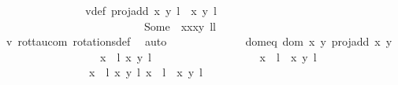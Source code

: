 \begin{isabellebody}
\ \ \ \ \ \ \ \ \ \ \ \ \isamarkupfalse%
\ \isamarkupfalse%
\ v{}{\isacharunderscore}def{\isacharcolon}\ {\isachardoublequoteopen}proj{\isacharunderscore}add\ {\isacharparenleft}{\isacharparenleft}x{\isacharcomma}\ y{\isacharparenright}{\isacharcomma}\ l{\isacharparenright}\ {\isacharparenleft}{\isasymtau}\ {\isacharparenleft}x{\isacharprime}{\isacharcomma}\ y{\isacharprime}{\isacharparenright}{\isacharcomma}\ l{\isacharprime}\ {\isacharplus}\ {}{\isacharparenright}\ {\isacharequal}\isanewline
\ \ \ \ \ \ \ \ \ \ \ \ \ \ \ \ \ \ \ \ \ \ \ \ \ \ Some\ {\isacharparenleft}{\isasymtau}\ {\isacharparenleft}x{\isacharasterisk}x{\isacharprime}{\isacharcomma}x{\isacharasterisk}y{\isacharprime}{\isacharparenright}{\isacharcomma}\ l{\isacharplus}l{\isacharprime}{\isacharplus}{}{\isacharparenright}{\isachardoublequoteclose}\isanewline
\ \ \ \ \ \ \ \ \ \ \ \ \ \ \isamarkupfalse%
\ v{}\ rot{\isacharunderscore}tau{\isacharunderscore}com\ rotations{\isacharunderscore}def\ \isamarkupfalse%
\ auto\isanewline
\ \ \ \ \ \ \ \ \ \ \ \ \isamarkupfalse%
\ dom{\isacharunderscore}eq{\isacharcolon}\ {\isachardoublequoteopen}{\isacharparenleft}dom\ {\isacharparenleft}{\isasymlambda}{\isacharparenleft}x{\isacharcomma}\ y{\isacharparenright}{\isachardot}\ proj{\isacharunderscore}add\ x\ y{\isacharparenright}\ {\isasyminter}\isanewline
\ \ \ \ \ \ \ \ \ \ \ \ \ \ \ \ \ \ {\isacharbraceleft}{\isacharparenleft}{\isacharparenleft}{\isacharparenleft}x{\isacharcomma}\ {}{\isacharparenright}{\isacharcomma}\ l{\isacharparenright}{\isacharcomma}\ {\isacharparenleft}x{\isacharprime}{\isacharcomma}\ y{\isacharprime}{\isacharparenright}{\isacharcomma}\ l{\isacharprime}{\isacharparenright}{\isacharcomma}\isanewline
\ \ \ \ \ \ \ \ \ \ \ \ \ \ \ \ \ \ \ {\isacharparenleft}{\isacharparenleft}{\isacharparenleft}x{\isacharcomma}\ {}{\isacharparenright}{\isacharcomma}\ l{\isacharparenright}{\isacharcomma}\ {\isasymtau}\ {\isacharparenleft}x{\isacharprime}{\isacharcomma}\ y{\isacharprime}{\isacharparenright}{\isacharcomma}\ l{\isacharprime}\ {\isacharplus}\ {}{\isacharparenright}{\isacharbraceright}{\isacharparenright}\ {\isacharequal}\ \isanewline
\ \ \ \ \ \ \ \ \ \ \ \ \ \ \ \ {\isacharbraceleft}{\isacharparenleft}{\isacharparenleft}{\isacharparenleft}x{\isacharcomma}\ {}{\isacharparenright}{\isacharcomma}\ l{\isacharparenright}{\isacharcomma}\ {\isacharparenleft}x{\isacharprime}{\isacharcomma}\ y{\isacharprime}{\isacharparenright}{\isacharcomma}\ l{\isacharprime}{\isacharparenright}{\isacharcomma}\ {\isacharparenleft}{\isacharparenleft}{\isacharparenleft}x{\isacharcomma}\ {}{\isacharparenright}{\isacharcomma}\ l{\isacharparenright}{\isacharcomma}\ {\isasymtau}\ {\isacharparenleft}x{\isacharprime}{\isacharcomma}\ y{\isacharprime}{\isacharparenright}{\isacharcomma}\ l{\isacharprime}\ {\isacharplus}\ {}{\isacharparenright}{\isacharbraceright}{\isachardoublequoteclose}\ \isanewline

\end{isabellebody}
